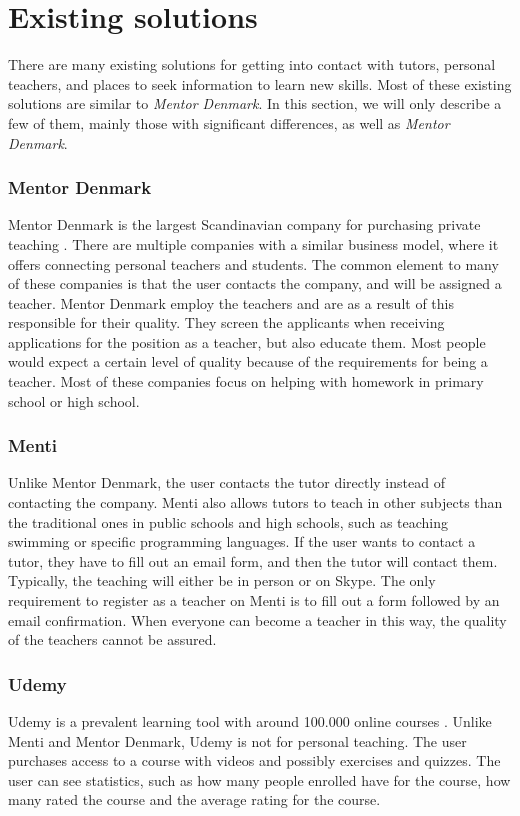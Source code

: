 \section{Existing solutions}
There are many existing solutions for getting into contact with tutors, personal teachers, and places to seek information to learn new skills.
Most of these existing solutions are similar to \textit{Mentor Denmark}.  
In this section, we will only describe a few of them, mainly those with significant differences, as well as \textit{Mentor Denmark}.

\subsubsection{Mentor Denmark}
Mentor Denmark is the largest Scandinavian company for purchasing private teaching \cite{skandinaviens-stoeste-lektiefirma}.
There are multiple companies with a similar business model, where it offers connecting personal teachers and students. 
The common element to many of these companies is that the user contacts the company, and will be assigned a teacher.
Mentor Denmark employ the teachers and are as a result of this responsible for their quality. 
They screen the applicants when receiving applications for the position as a teacher, but also educate them. 
Most people would expect a certain level of quality because of the requirements for being a teacher.
Most of these companies focus on helping with homework in primary school or high school.

\subsubsection{Menti}
Unlike Mentor Denmark, the user contacts the tutor directly instead of contacting the company.
Menti also allows tutors to teach in other subjects than the traditional ones in public schools and high schools, such as teaching swimming or specific programming languages.
If the user wants to contact a tutor, they have to fill out an email form, and then the tutor will contact them.
Typically, the teaching will either be in person or on Skype.
The only requirement to register as a teacher on Menti is to fill out a form followed by an email confirmation.
When everyone can become a teacher in this way, the quality of the teachers cannot be assured.

\subsubsection{Udemy}
Udemy is a prevalent learning tool with around 100.000 online courses \cite{udemy}.
Unlike Menti and Mentor Denmark, Udemy is not for personal teaching. 
The user purchases access to a course with videos and possibly exercises and quizzes. 
The user can see statistics, such as how many people enrolled have for the course, how many rated the course and the average rating for the course.

